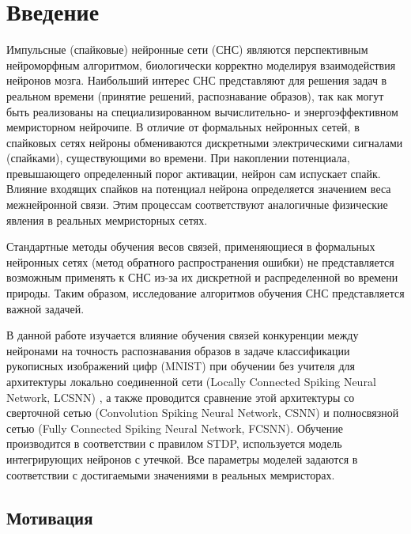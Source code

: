 \documentclass[a4paper]{article}
\begin{document}
\thispagestyle{empty} 

\tableofcontents

\section{Введение}
Импульсные (спайковые) нейронные сети (СНС) являются перспективным нейроморфным алгоритмом, биологически корректно моделируя взаимодействия нейронов мозга. Наибольший интерес СНС представляют для решения задач в реальном времени (принятие решений, распознавание образов), так как могут быть реализованы на специализированном вычислительно- и энергоэффективном мемристорном нейрочипе.  В отличие от формальных нейронных сетей, в спайковых сетях нейроны обмениваются дискретными электрическими сигналами (спайками), существующими во времени. При накоплении потенциала, превышающего определенный порог активации, нейрон сам испускает спайк. Влияние входящих спайков на потенциал нейрона определяется значением веса межнейронной связи. Этим процессам соответствуют аналогичные физические явления в реальных мемристорных сетях.

Стандартные методы обучения весов связей, применяющиеся в формальных нейронных сетях (метод обратного распространения ошибки) не представляется возможным применять к СНС из-за их дискретной и распределенной во времени природы. Таким образом, исследование алгоритмов обучения СНС представляется важной задачей.

В данной работе изучается влияние обучения связей конкуренции \cite{MaxActiv1} \cite{MaxActiv2} между нейронами на точность распознавания образов в задаче классификации рукописных изображений цифр (MNIST) при обучении без учителя для архитектуры локально соединенной сети (Locally Connected Spiking Neural Network, LCSNN) \cite{saunders2019locally}, а также проводится сравнение этой архитектуры со сверточной сетью (Convolution Spiking Neural Network, CSNN) и полносвязной сетью (Fully Connected Spiking Neural Network, FCSNN). Обучение производится в соответствии с правилом STDP, используется модель интегрирующих нейронов с утечкой. Все параметры моделей задаются в соответствии с достигаемыми значениями в реальных мемристорах.


\subsection{Мотивация}
\end{document}
